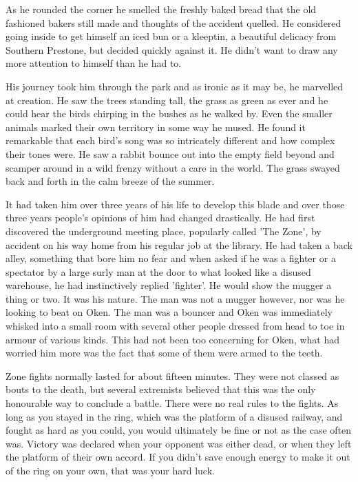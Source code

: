 As he rounded the corner he smelled the freshly baked bread that the old fashioned bakers still made and thoughts of the accident quelled. He considered going inside to get himself an iced bun or a kleeptin, a beautiful delicacy from Southern Prestone, but decided quickly against it. He didn't want to draw any more attention to himself than he had to.

His journey took him through the park and as ironic as it may be, he marvelled at creation. He saw the trees standing tall, the grass as green as ever and he could hear the birds chirping in the bushes as he walked by. Even the smaller animals marked their own territory in some way he mused. He found it remarkable that each bird's song was so intricately different and how complex their tones were. He saw a rabbit bounce out into the empty field beyond and scamper around in a wild frenzy without a care in the world. The grass swayed back and forth in the calm breeze of the summer.

It had taken him over three years of his life to develop this blade and over those three years people's opinions of him had changed drastically. He had first discovered the underground meeting place, popularly called 'The Zone', by accident on his way home from his regular job at the library. He had taken a back alley, something that bore him no fear and when asked if he was a fighter or a spectator by a large surly man at the door to what looked like a disused warehouse, he had instinctively replied 'fighter'. He would show the mugger a thing or two. It was his nature. The man was not a mugger however, nor was he looking to beat on Oken. The man was a bouncer and Oken was immediately whisked into a small room with several other people dressed from head to toe in armour of various kinds. This had not been too concerning for Oken, what had worried him more was the fact that some of them were armed to the teeth.

Zone fights normally lasted for about fifteen minutes. They were not classed as bouts to the death, but several extremists believed that this was the only honourable way to conclude a battle. There were no real rules to the fights. As long as you stayed in the ring, which was the platform of a disused railway, and fought as hard as you could, you would ultimately be fine or not as the case often was. Victory was declared when your opponent was either dead, or when they left the platform of their own accord. If you didn't save enough energy to make it out of the ring on your own, that was your hard luck.

